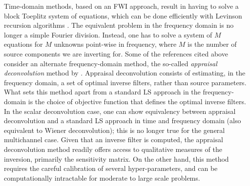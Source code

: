 Time-domain methods, based on an FWI approach, result in having to solve a block Toeplitz system of equations, which can be done efficiently with Levinson recursion algorithms \citep{Robinson:83,Trench:64}.
The equivalent problem in the frequency domain is no longer a simple Fourier division.
Instead, one has to solve a system of $M$ equations for $M$ unknowns point-wise in frequency, where $M$ is the number of source components we are inverting for.%
Some of the references cited above consider an alternate frequency-domain method, the so-called \emph{appraisal deconvolution} method by \cite{Oldenburg:82}.
Appraisal deconvolution consists of estimating, in the frequency domain, a set of optimal inverse filters, rather than source parameters.
What sets this method apart from a standard LS approach in the frequency-domain is the choice of objective function that defines the optimal inverse filters. 
In the scalar deconvolution case, one can show equivalency between appraisal deconvolution and a standard LS approach in time and frequency domain (also equivalent to Wiener deconvolution); this is no longer true for the general multichannel case.
Given that an inverse filter is computed, the appraisal deconvolution method readily offers access to qualitative measures of the inversion, primarily the sensitivity matrix.
On the other hand, this method requires the careful calibration of several hyper-parameters, and can be computationally intractable for moderate to large scale problems.


